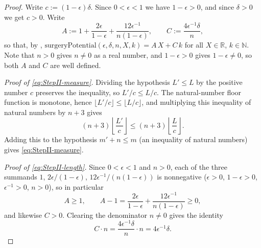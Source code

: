 \begin{proof}
  Write $c := (1-\epsilon)\delta$. Since $0<\epsilon<1$ we have $1-\epsilon>0$, and since
  $\delta>0$ we get $c>0$. Write
  \[
    A := 1 + \frac{2\epsilon}{1-\epsilon} + \frac{12\epsilon^{-1}}{n(1-\epsilon)}
    , \qquad
    C := \frac{4\epsilon^{-1}\delta}{n}
    ,
  \]
  so that, by ,
  $\mathrm{surgeryPotential}(\epsilon,\delta,n,X,k) = A\,X + C\,k$ for all $X \in \mathbb{R}$,
  $k \in \mathbb{N}$. Note that $n>0$ gives $n \ne 0$ as a real number, and $1-\epsilon>0$ gives
  $1-\epsilon\ne0$, so both $A$ and $C$ are well defined.

  \emph{Proof of \eqref{eq:StepII-measure}.} Dividing the hypothesis $L'\le L$ by the positive
  number $c$ preserves the inequality, so $L'/c \le L/c$. The natural-number floor function is
  monotone, hence $\lfloor L'/c\rfloor \le \lfloor L/c\rfloor$, and multiplying this inequality of
  natural numbers by $n+3$ gives
  \[
    (n+3)\left\lfloor \frac{L'}{c} \right\rfloor \le (n+3)\left\lfloor \frac{L}{c} \right\rfloor
    .
  \]
  Adding this to the hypothesis $m'+n\le m$ (an inequality of natural numbers) gives
  \eqref{eq:StepII-measure}.

  \emph{Proof of \eqref{eq:StepII-length}.} Since $0<\epsilon<1$ and $n>0$, each of the three
  summands $1$, $2\epsilon/(1-\epsilon)$, $12\epsilon^{-1}/(n(1-\epsilon))$ is nonnegative
  ($\epsilon>0$, $1-\epsilon>0$, $\epsilon^{-1}>0$, $n>0$), so in particular
  \begin{equation}
    \label{eq:StepII-Age1}
    A \ge 1
    , \qquad A - 1 = \frac{2\epsilon}{1-\epsilon} + \frac{12\epsilon^{-1}}{n(1-\epsilon)} \ge 0
    ,
  \end{equation}
  and likewise $C>0$. Clearing the denominator $n \ne 0$ gives the identity
  \begin{equation}
    \label{eq:StepII-Cn}
    C \cdot n = \frac{4\epsilon^{-1}\delta}{n}\cdot n = 4\epsilon^{-1}\delta
    .
  \end{equation}


\end{proof}

